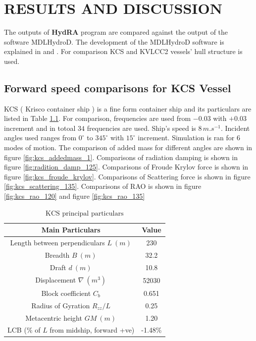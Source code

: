 \chapter{RESULTS AND DISCUSSION}
The outputs of  {\bf HydRA} program are compared against the output of the \newline 
software MDLHydroD. The development of the 
MDLHydroD software is explained in \cite{guha2013development} and \cite{guha2015estimation}.
For comparison KCS and KVLCC2 vessels' hull structure is used. 

\section{Forward speed comparisons for KCS Vessel}
KCS ( Krisco container ship ) is a fine form container ship and its particulars are listed in Table 
\ref{tab:kcs_principal_particulars}. 
For comparison, frequencies are used from
$-0.03$ with $+0.03$ increment and in totoal $34$ frequencies are used. Ship's speed is $8\,\si{m.s^{-1}}$. 
Incident angles used 
ranges from $0^{\circ}$ to $345^{\circ}$ with $15^{\circ}$ increment. Simulation is ran for 6 modes of motion.  
The comparison of added mass for different angles are shown in figure \ref{fig:kcs_addedmass_1}.
Comparisons of radiation damping is shown in figure \ref{fig:radition_damp_125}. 
Comparisons of Froude Krylov force is shown in figure \ref{fig:kcs_froude_krylov}.
Comparisons of Scattering force is shown in figure \ref{fig:kcs_scattering_135}. 
Comparisons of RAO is shown in figure \ref{fig:kcs_rao_120}
and figure \ref{fig:kcs_rao_135}

\begin{table}[h]
    \centering
    \setlength{\tabcolsep}{10pt} %
    \renewcommand{\arraystretch}{1.17} %
    \begin{tabular}{|c|c|}
        \hline
        {\bf Main Particulars} & {\bf Value} \\
        \hline 
        Length between perpendiculars $L ~(m)$ & 230 \\ 
        Breadth $B ~(m)$ & 32.2  \\
        Draft $d ~(m)$ & 10.8  \\
        Displacement $\nabla ~(m^{3})$ & 52030  \\
        Block coefficient $C_{b}$ & 0.651   \\
        Radius of Gyration $R_{zz}/L$ & 0.25 \\
        Metacentric height $GM ~(m)$ & 1.20 \\
        LCB (\% of $L$ from midship, forward +ve) & -1.48\% \\
        \hline
    \end{tabular}
    \caption{$\text{KCS principal particulars}$}
    \label{tab:kcs_principal_particulars}
\end{table}


